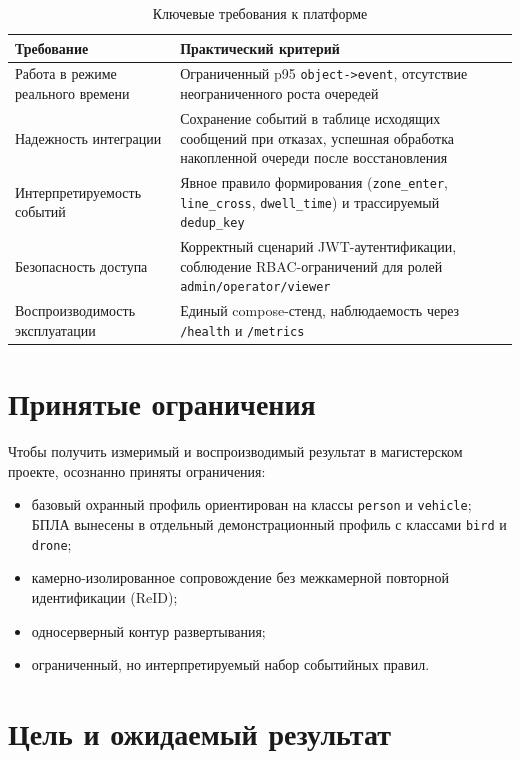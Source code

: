 \begin{table}[H]
\caption{Ключевые требования к платформе}
\label{tab:short_requirements}
\begin{tabularx}{\textwidth}{>{\raggedright\arraybackslash}p{}X}
\toprule
Требование & Практический критерий \\
\midrule
Работа в режиме реального времени & Ограниченный p95 \texttt{object->event}, отсутствие неограниченного роста очередей \\
Надежность интеграции & Сохранение событий в таблице исходящих сообщений при отказах, успешная обработка накопленной очереди после восстановления \\
Интерпретируемость событий & Явное правило формирования (\texttt{zone\_enter}, \texttt{line\_cross}, \texttt{dwell\_time}) и трассируемый \texttt{dedup\_key} \\
Безопасность доступа & Корректный сценарий JWT-аутентификации, соблюдение RBAC-ограничений для ролей \texttt{admin/operator/viewer} \\
Воспроизводимость эксплуатации & Единый compose-стенд, наблюдаемость через \texttt{/health} и \texttt{/metrics} \\
\bottomrule
\end{tabularx}
\end{table}

\section{Принятые ограничения}

Чтобы получить измеримый и воспроизводимый результат в магистерском проекте, осознанно приняты ограничения:
\begin{itemize}
    \item базовый охранный профиль ориентирован на классы \texttt{person} и \texttt{vehicle}; БПЛА вынесены в отдельный демонстрационный профиль с классами \texttt{bird} и \texttt{drone};
    \item камерно-изолированное сопровождение без межкамерной повторной идентификации (ReID);
    \item односерверный контур развертывания;
    \item ограниченный, но интерпретируемый набор событийных правил.
\end{itemize}

\section{Цель и ожидаемый результат}


